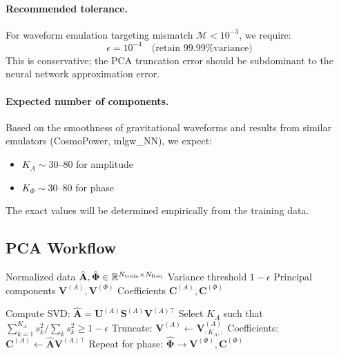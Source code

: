 \documentclass[11pt,a4paper]{article}
\begin{document}
\paragraph{Recommended tolerance.}
For waveform emulation targeting mismatch $\mathcal{M} < 10^{-3}$, we require:
\begin{equation}
    \epsilon = 10^{-4} \quad \text{(retain 99.99\% variance)}
\end{equation}
This is conservative; the PCA truncation error should be subdominant to the neural network approximation error.

\paragraph{Expected number of components.}
Based on the smoothness of gravitational waveforms and results from similar emulators (CosmoPower, mlgw\_NN), we expect:
\begin{itemize}
    \item $K_A \sim 30$--$80$ for amplitude
    \item $K_\Phi \sim 30$--$80$ for phase
\end{itemize}
The exact values will be determined empirically from the training data.

\subsection{PCA Workflow}

\begin{algorithm}[H]
\caption{PCA Compression (Training)}
\label{alg:pca_train}
\begin{algorithmic}[1]
\Require Normalized data $\hat{\mathbf{A}}, \hat{\mathbf{\Phi}} \in \mathbb{R}^{N_{\rm train} \times N_{\rm freq}}$
\Require Variance threshold $1 - \epsilon$
\Ensure Principal components $\mathbf{V}^{(A)}, \mathbf{V}^{(\Phi)}$
\Ensure Coefficients $\mathbf{C}^{(A)}, \mathbf{C}^{(\Phi)}$

\State Compute SVD: $\hat{\mathbf{A}} = \mathbf{U}^{(A)} \mathbf{S}^{(A)} \mathbf{V}^{(A)\top}$
\State Select $K_A$ such that $\sum_{k=1}^{K_A} s_k^2 / \sum_k s_k^2 \geq 1 - \epsilon$
\State Truncate: $\mathbf{V}^{(A)} \gets \mathbf{V}^{(A)}_{:K_A, :}$
\State Coefficients: $\mathbf{C}^{(A)} \gets \hat{\mathbf{A}} \mathbf{V}^{(A)\top}$
\State Repeat for phase: $\hat{\mathbf{\Phi}} \to \mathbf{V}^{(\Phi)}, \mathbf{C}^{(\Phi)}$
\end{algorithmic}
\end{algorithm}
\end{document}
